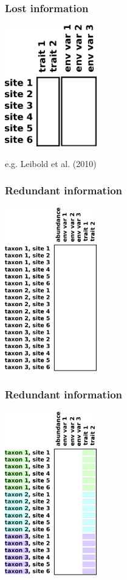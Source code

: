 \documentclass{beamer}
\numberwithin{exercise}{section}
\begin{document}
\begin{frame}
\frametitle{Lost information}
\begin{center}
\includegraphics[width=4cm]{forthcorner2dataframeSUMMARIZE2}
\end{center}
\footnotesize{e.g. Leibold et al. (2010)}
\end{frame}

\begin{frame}
\frametitle{Redundant information}
\begin{center}
\includegraphics[width=4cm]{forthcorner2dataframeREPEAT}
\end{center}
\end{frame}

\begin{frame}
\frametitle{Redundant information}
\begin{center}
\includegraphics[width=4cm]{forthcorner2dataframeREPEAT3}
\end{center}
\end{frame}
\end{document}
